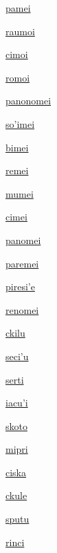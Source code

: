 {\hyperlink{val:pamei}{pamei}}{}{}{}

{\hyperlink{val:raumoi}{raumoi}}{}{}{}

{\hyperlink{val:cimoi}{cimoi}}{}{}{}

{\hyperlink{val:romoi}{romoi}}{}{}{}

{\hyperlink{val:panonomei}{panonomei}}{}{}{}

{\hyperlink{val:sohimei}{so'imei}}{}{}{}

{\hyperlink{val:bimei}{bimei}}{}{}{}

{\hyperlink{val:remei}{remei}}{}{}{}

{\hyperlink{val:mumei}{mumei}}{}{}{}

{\hyperlink{val:cimei}{cimei}}{}{}{}

{\hyperlink{val:panomei}{panomei}}{}{}{}

{\hyperlink{val:paremei}{paremei}}{}{}{}

{\hyperlink{val:piresihe}{piresi'e}}{}{}{}

{\hyperlink{val:renomei}{renomei}}{}{}{}

{\hyperlink{val:ckilu}{ckilu}}{}{}{}

{\hyperlink{val:secihu}{seci'u}}{}{}{}

{\hyperlink{val:serti}{serti}}{}{}{}

{\hyperlink{val:iacuhi}{iacu'i}}{}{}{}

{\hyperlink{val:skoto}{skoto}}{}{}{}

{\hyperlink{val:mipri}{mipri}}{}{}{}

{\hyperlink{val:ciska}{ciska}}{}{}{}

{\hyperlink{val:ckule}{ckule}}{}{}{}

{\hyperlink{val:sputu}{sputu}}{}{}{}

{\hyperlink{val:rinci}{rinci}}{}{}{}

